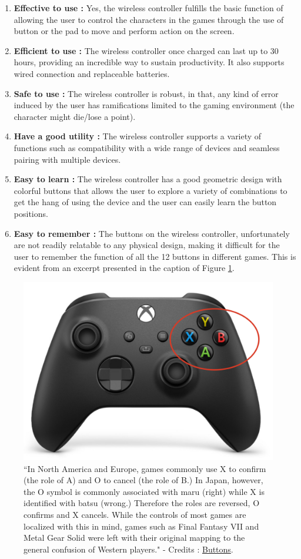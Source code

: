 \documentclass[10pt]{scrartcl}
\begin{document}
\begin{enumerate}
	\item \textbf{Effective to use :} Yes, the wireless controller fulfills the basic function of allowing the user to control the characters in the games through the use of button or the pad to move and perform action on the screen.
	
	\item\textbf{Efficient to use :} The wireless controller once charged can last up to 30 hours, providing an incredible way to sustain productivity. It also supports wired connection and replaceable batteries.
	
	\item \textbf{Safe to use  :} The wireless controller is robust, in that, any kind of error induced by the user has ramifications limited to the gaming environment (the character might die/lose a point).
	
	\item \textbf{Have a good utility :} The wireless controller supports a variety of functions such as compatibility with a wide range of devices and seamless pairing with multiple devices.
	
 \item \textbf{Easy to learn :} The wireless controller has a good geometric design with colorful buttons that allows the user to explore a variety of combinations to get the hang of using the device and the user can easily learn the button positions.
	
	\item \textbf{Easy to remember : } The buttons on the wireless controller, unfortunately are not readily relatable to any physical design, making it difficult for the user to remember the function of all the 12 buttons in different games. This is evident from an excerpt presented in the caption of Figure \ref{fig:xbox}.
	
\end{enumerate}


\begin{figure}
	\centering
	\includegraphics[width=0.2\linewidth]{xbox}
	\caption{``In North America and Europe, games commonly use X to confirm (the role of A) and O to cancel (the role of B.) In Japan, however, the O symbol is commonly associated with maru (right) while X is identified with batsu (wrong.) Therefore the roles are reversed, O confirms and X cancels. While the controls of most games are localized with this in mind, games such as Final Fantasy VII and Metal Gear Solid were left with their original mapping to the general confusion of Western players." - Credits : \href{http://gangles.ca/2008/09/16/a-brief-history-of-a-b/}{Buttons}. }
	\label{fig:xbox}
\end{figure}
\end{document}
